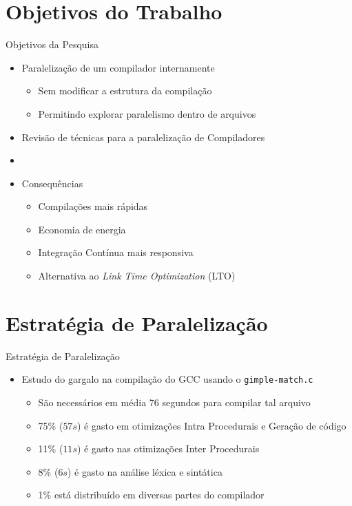 \section{Objetivos do Trabalho}

\begin{frame}{Objetivos da Pesquisa}
    \begin{itemize}
        \item Paralelização de um compilador internamente
        \begin{itemize}
            \item Sem modificar a estrutura da compilação
            \item Permitindo explorar paralelismo dentro de arquivos
        \end{itemize}
        \item Revisão de técnicas para a paralelização de Compiladores
        \item[]
        \item Consequências
        \begin{itemize}
            \item Compilações mais rápidas
            \item Economia de energia
            \item Integração Contínua mais responsiva
            \item Alternativa ao \textit{Link Time Optimization} (LTO)
        \end{itemize}
    \end{itemize}
\end{frame}

\section{Estratégia de Paralelização}

\begin{frame}{Estratégia de Paralelização}
    \begin{itemize}
        \item Estudo do gargalo na compilação do GCC usando o \texttt{gimple-match.c}
            \begin{itemize}
                \item São necessários em média 76 segundos para compilar tal arquivo
                \item 75\% ($57s$) é gasto em otimizações Intra Procedurais e Geração de código
                \item 11\% ($11s$) é gasto nas otimizações Inter Procedurais
                \item 8\% ($6s$) é gasto na análise léxica e sintática
                \item 1\% está distribuído em diversas partes do compilador
            \end{itemize}
    \end{itemize}
\end{frame}

